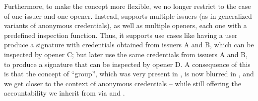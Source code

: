 Furthermore, to make the concept more flexible, we no longer restrict to the
case of one issuer and one opener. Instead, \UAS supports multiple issuers (as
in generalized variants of anonymous credentials), as well as multiple openers,
each one with a predefined inspection function. Thus, it supports use cases like
having a user produce a signature with credentials obtained from issuers A and
B, which can be inspected by opener C; but later use the same credentials
from issuers A and B, to produce a signature that can be inspected by opener D.
A consequence of this is that the concept of ``group'', which was very present
in \GSAC, is now blurred in \UAS, and we get closer to the context of anonymous
credentials -- while still offering the accountability we inherit from \GSAC
via \Open and \Judge.





